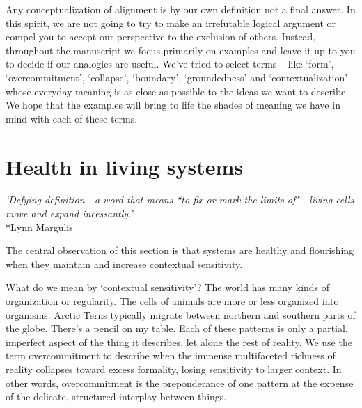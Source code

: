 \documentclass[12pt]{article}
\begin{document}
Any conceptualization of alignment is by our own definition not a final answer. In this spirit, we are not going to try to make an irrefutable logical argument or compel you to accept our perspective to the exclusion of others. Instead, throughout the manuscript we focus primarily on examples and leave it up to you to decide if our analogies are useful. We've tried to select terms -- like `form', `overcommitment', `collapse', `boundary', `groundedness' and `contextualization' -- whose everyday meaning is as close as possible to the ideas we want to describe. We hope that the examples will bring to life the shades of meaning we have in mind with each of these terms.



\section{Health in living systems}

\begin{center}
\textit{`Defying definition---a word that means ``to fix or mark the limits of"---living cells move and expand incessantly.'}\\*Lynn Margulis
\end{center}

The central observation of this section is that systems are healthy and flourishing when they maintain and increase contextual sensitivity. 

What do we mean by `contextual sensitivity'? The world has many kinds of organization or regularity. The cells of animals are more or less organized into organisms. Arctic Terns typically migrate between northern and southern parts of the globe. There's a pencil on my table. Each of these patterns is only a partial, imperfect aspect of the thing it describes, let alone the rest of reality. We use the term overcommitment to describe when the immense multifaceted richness of reality collapses toward excess formality, losing sensitivity to larger context. In other words, overcommitment is the preponderance of one pattern at the expense of the delicate, structured interplay between things.

\end{document}
